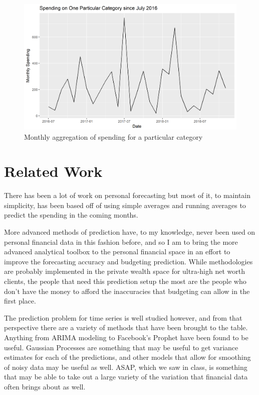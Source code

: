 \documentclass[11pt,a4paper]{article}
\newenvironment{updatematerial}{
\color{blue}
}{

}
\begin{document}
\begin{updatematerial}
	\begin{figure}
		\centering
		\includegraphics[width=0.7\linewidth]{../figures/Spending_Example}
		\caption{Monthly aggregation of spending for a particular category}
		\label{fig:spendingexample}
	\end{figure}
	
	
\end{updatematerial}


\section{Related Work}

There has been a lot of work on personal forecasting but most of it, to maintain simplicity, has been based off of using simple averages and running averages to predict the spending in the coming months. 

More advanced methods of prediction have, to my knowledge, never been used on personal financial data in this fashion before, and so I am to bring the more advanced analytical toolbox to the personal financial space in an effort to improve the forecasting accuracy and budgeting prediction. While methodologies are probably implemented in the private wealth space for ultra-high net worth clients, the people that need this prediction setup the most are the people who don't have the money to afford the inaccuracies that budgeting can allow in the first place. 

The prediction problem for time series is well studied however, and from that perspective there are a variety of methods that have been brought to the table. Anything from ARIMA modeling to Facebook's Prophet have been found to be useful. Gaussian Processes are something that may be useful to get variance estimates for each of the predictions, and other models that allow for smoothing of noisy data may be useful as well. ASAP, which we saw in class, is something that may be able to take out a large variety of the variation that financial data often brings about as well. 
\end{document}
